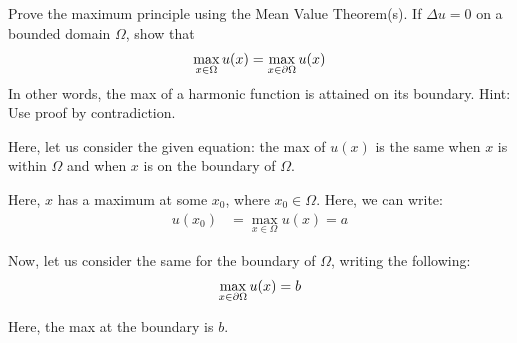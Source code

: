\item Prove the maximum principle using the Mean Value Theorem(s). If $\Delta u = 0$ on a bounded domain $\Omega$, show that
%
\begin{align}
  \max_{x \in \Omega} u(x) = \max_{x \in \partial \Omega} u(x)
\end{align}
In other words, the max of a harmonic function is attained on its boundary. Hint: Use proof by contradiction.
\bigbreak

Here, let us consider the given equation: the max of $u(x)$ is the same when $x$ is within $\Omega$ and when $x$ is on the boundary of $\Omega$.

Here, $x$ has a maximum at some $x_0$, where $x_0 \in \Omega$. Here, we can write:
%
\begin{align}
  u(x_0) & = \max_{x \in \Omega} u(x) = a
\end{align}

Now, let us consider the same for the boundary of $\Omega$, writing the following:
%
\begin{align}
  \max_{x \in \partial \Omega} u(x) = b
\end{align}

Here, the max at the boundary is $b$.
